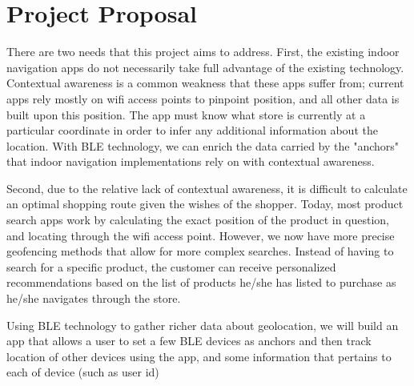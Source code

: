 \documentclass{sig-alternate}
\begin{document}
\section{Project Proposal}
\label{sec:project_proposal}
There are two needs that this project aims to address. First, the 
existing indoor navigation apps do not necessarily take full 
advantage of the existing technology. Contextual awareness is a 
common weakness that these apps suffer from; current apps rely 
mostly on wifi access points to pinpoint position, and all other
data is built upon this position. The app must know what store is 
currently at a particular coordinate in order to infer any 
additional information about the location. With BLE technology,
we can enrich the data carried by the "anchors" that indoor 
navigation implementations rely on with contextual awareness. 

Second, due to the relative lack of contextual awareness, it is
difficult to calculate an optimal shopping route given the wishes
of the shopper. Today, most product search apps work by 
calculating the exact position of the product in question, and
locating through the wifi access point. However, we now have 
more precise geofencing methods that allow for more complex
searches. Instead of having to search for a specific product, the 
customer can receive personalized recommendations based on
the list of products he/she has listed to purchase as he/she 
navigates through the store.

Using BLE technology to gather richer data about geolocation,
we will build an app that allows a user to set a few BLE devices
as anchors and then track location of other devices using
the app, and some information that pertains to each of device
(such as user id)
\end{document}
